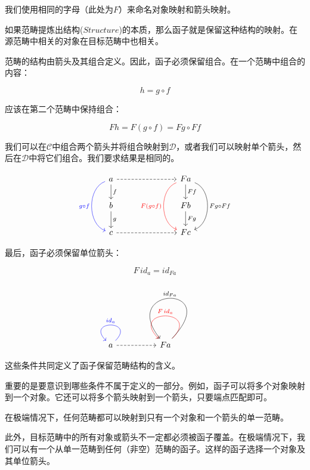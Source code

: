 \documentclass[DaoFP]{subfiles}
\begin{document}
    我们使用相同的字母（此处为$F$）来命名对象映射和箭头映射。

    如果范畴提炼出结构($Structure$)的本质，那么函子就是保留这种结构的映射。在源范畴中相关的对象在目标范畴中也相关。

    范畴的结构由箭头及其组合定义。因此，函子必须保留组合。在一个范畴中组合的内容：

    $$h = g \circ f$$

    应该在第二个范畴中保持组合：

    $$F h = F (g \circ f) = F g \circ F f$$

    我们可以在$\mathcal{C}$中组合两个箭头并将组合映射到$\mathcal{D}$，或者我们可以映射单个箭头，然后在$\mathcal{D}$中将它们组合。我们要求结果是相同的。

    \[
        \begin{tikzcd}
            a
            \arrow[d, "f"]
            \arrow[rrr, dashed]
            \arrow[dd, bend right = 70, blue, "g \circ f"']
            &&& F a
            \arrow[d, "F f"]
            \arrow[dd, bend left = 70, "F g \circ F f"]
            \arrow[dd, bend right = 70, red, "F (g \circ f)"']
            \\
            b
            \arrow[d, "g"]
            &&& F b
            \arrow[d, "F g"]
            \\
            c
            \arrow[rrr, dashed]
            &&& F c
        \end{tikzcd}
    \]

    最后，函子必须保留单位箭头：

    $$F\, id_a = id_{F a}$$

    \[
        \begin{tikzcd}
            a
            \arrow[loop, blue,  "id_a"']
            \arrow[rr, dashed]
            && F a
            \arrow[loop, red, "F \, id_{a}"']
            \arrow[loop, controls={+(2.5, 2.6) and +(-2, 2.5)}, "id_{F a}"']
        \end{tikzcd}
    \]

    这些条件共同定义了函子保留范畴结构的含义。

    重要的是要意识到哪些条件不属于定义的一部分。例如，函子可以将多个对象映射到一个对象。它还可以将多个箭头映射到一个箭头，只要端点匹配即可。

    在极端情况下，任何范畴都可以映射到只有一个对象和一个箭头的单一范畴。

    此外，目标范畴中的所有对象或箭头不一定都必须被函子覆盖。在极端情况下，我们可以有一个从单一范畴到任何（非空）范畴的函子。这样的函子选择一个对象及其单位箭头。
\end{document}
